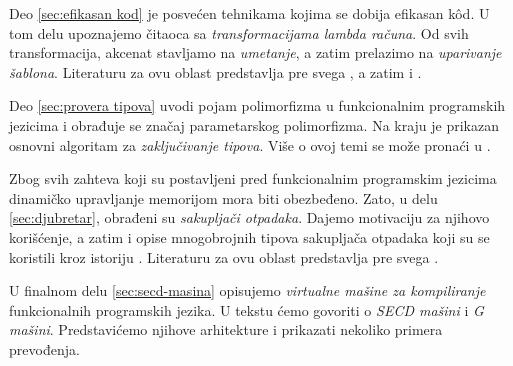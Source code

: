 Deo \ref{sec:efikasan kod} je posvećen tehnikama kojima se dobija efikasan k\^od. U tom delu upoznajemo čitaoca sa \textit{transformacijama lambda računa}. Od svih transformacija, akcenat stavljamo na \textit{umetanje}, a zatim prelazimo na \textit{uparivanje šablona}. Literaturu za ovu oblast predstavlja pre svega \cite{the-implementation-of-functional-programming-languages}, a zatim i \cite{compilation-by-program-transformation, haskell-by-program-transformation, secrets-haskell-compiler-inliner, compiler-design, compiling-fl}.

Deo \ref{sec:provera tipova} uvodi pojam polimorfizma u funkcionalnim programskih jezicima i obrađuje se značaj parametarskog polimorfizma. Na kraju je prikazan osnovni algoritam za \textit{zaključivanje tipova}. Više o ovoj temi se može pronaći u \cite{the-implementation-of-functional-programming-languages, basic-typechecking}.

Zbog svih zahteva koji su postavljeni pred funkcionalnim programskim jezicima dinamičko upravljanje memorijom mora biti obezbeđeno. Zato, u delu \ref{sec:djubretar}, obrađeni su \textit{sakupljači otpadaka}. Dajemo motivaciju za njihovo korišćenje, a zatim i opise mnogobrojnih tipova sakupljača otpadaka koji su se koristili kroz istoriju \cite{appel, mcca60, col60, feni69, app87}. Literaturu za ovu oblast predstavlja pre svega \cite{the-implementation-of-functional-programming-languages}.

U finalnom delu \ref{sec:secd-masina} opisujemo \textit{virtualne mašine za kompiliranje} funkcionalnih programskih jezika. U tekstu ćemo govoriti o \textit{SECD mašini} i \textit{G mašini}. Predstavićemo njihove arhitekture i prikazati nekoliko primera prevođenja.
